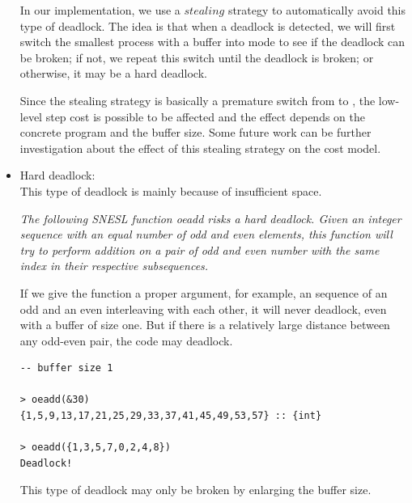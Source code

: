 \begin{itemize}
In our implementation, we use a $stealing$ strategy to  automatically avoid this type of deadlock. 
The idea is that when a deadlock is detected, we will first switch the smallest process with a \filling buffer into \draining mode to see if the deadlock can be broken; if not, we repeat this switch until the deadlock is broken; or otherwise, it may be a hard deadlock.

Since the stealing strategy is basically a premature
switch from \filling to \draining, the low-level step cost is possible to be affected and the effect depends on the concrete program and the buffer size. 
Some future work can be further investigation about the effect of this stealing strategy on the cost model.\\


\item Hard deadlock: \\
This type of deadlock is mainly because of insufficient space.

\begin{example} \emph{The following SNESL function {\ttfamily oeadd} risks a hard deadlock. Given an integer sequence with an equal number of odd and even elements, this function will try to perform addition on a pair of odd and even number with the same index in their respective subsequences.} 
\end{example}

 
\hspace{0.3cm}

If we give the function a proper argument, for example, an sequence of an odd and an even interleaving with each other, it will never deadlock, even with a buffer of size one. 
But if there is a relatively large distance between any odd-even pair, the code may deadlock.  \\
  
\begin{lstlisting}[style=nesl-style]
-- buffer size 1

> oeadd(&30)
{1,5,9,13,17,21,25,29,33,37,41,45,49,53,57} :: {int}

> oeadd({1,3,5,7,0,2,4,8})
Deadlock!
\end{lstlisting}


This type of deadlock may only be broken by enlarging the buffer size. 


\end{itemize}


